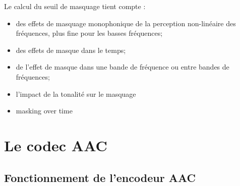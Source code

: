 \documentclass{article}
\begin{document}
    
    
    
    Le calcul du seuil de masquage tient compte\cite{2019-Herre-Dick} :
    \begin{itemize}
        \item des effets de masquage monophonique de la perception non-linéaire des fréquences, plus fine pour les basses fréquences;
        \item des effets de masque dans le temps;
        \item de l'effet de masque dans une bande de fréquence ou entre bandes de fréquences;
        \item l'impact de la tonalité sur le masquage
        \item masking over time
    \end{itemize}


    \newpage
    \section{Le codec AAC}
    \label{sec:AAC}
    \subsection{Fonctionnement de l'encodeur AAC}




\end{document}
